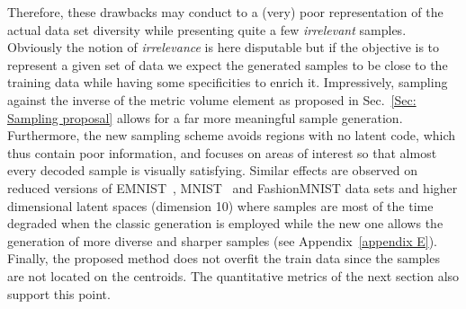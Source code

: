 \documentclass[10pt,journal,compsoc]{IEEEtran}
\begin{document}
        Therefore, these drawbacks may conduct to a (very) poor representation of the actual data set diversity while presenting quite a few \textit{irrelevant} samples. Obviously the notion of \textit{irrelevance} is here disputable but if the objective is to represent a given set of data we expect the generated samples to be close to the training data while having some specificities to enrich it. Impressively, sampling against the inverse of the metric volume element as proposed in Sec.~\ref{Sec: Sampling proposal} allows for  a far more meaningful sample generation. Furthermore, the new sampling scheme avoids regions with no latent code, which thus contain poor information, and focuses on areas of interest so that almost every decoded sample is visually satisfying. Similar effects are observed on reduced versions of EMNIST~\cite{cohen_emnist_2017},  MNIST~\cite{lecun_mnist_1998} and FashionMNIST data sets and higher dimensional latent spaces (dimension 10) where samples are most of the time degraded when the classic generation is employed while the new one allows the generation of more diverse and sharper samples (see Appendix~\ref{appendix E}). Finally, the proposed method does not overfit the train data since the samples are not located on the centroids. The quantitative metrics of the next section also support this point.
\end{document}
